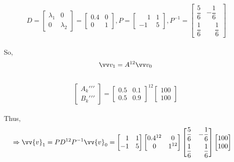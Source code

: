 \documentclass[10pt,a4paper]{article}
\numberwithin{equation}{section}
\begin{document}
	
		
		\[\ D=\begin{bmatrix}
				\lambda_{1} & 0 \\
				0 & \lambda_{2} 
				\end{bmatrix}
				=\begin{bmatrix}
				0.4 & 0 \\
				0 & 1
				\end{bmatrix}, 
				P = \begin{bmatrix}
					\phantom{-}1 & 1 \\
					-1 & 5
					\end{bmatrix},
				P^{-1} = \begin{bmatrix}
					\dfrac{5}{6} & -\dfrac{1}{6} \\[8pt]
					
					\dfrac{1}{6} & \phantom{-}\dfrac{1}{6}
					\end{bmatrix}
				\]
		\\
		So,
		\[\begin{aligned}
				\vv v_{1} = A^{12} \vv v_{0}
				\end{aligned}\]\\
		\[\begin{bmatrix}
		A_{k}{\prime\prime\prime}\\B_{k}{\prime\prime\prime}
		\end{bmatrix}
		=
		\begin{bmatrix}
		0.5 & 0.1\\ 0.5 & 0.9
		
		\end{bmatrix}^{12}
		\begin{bmatrix*}
		100 \\ 100
		\end{bmatrix*}\]\\
		Thus,
		\[\begin{aligned}\Rightarrow\vv{v}_1 = PD^{12}P^{-1} \vv{v}_0
				&=\begin{bmatrix}
						\phantom{-}1 & 1\\ -1 & 5
						\end{bmatrix}
						\begin{bmatrix}
						0.4^{12} & 0\\ 0 & 1^{12}
						\end{bmatrix}
						\begin{bmatrix}
						\dfrac{5}{6} & -\dfrac{1}{6} \\[8pt]
						\dfrac{1}{6} & \phantom{-}\dfrac{1}{6}
					\end{bmatrix}\begin{bmatrix}
					100 \\ 100
					\end{bmatrix}					
				\end{aligned}
				\]\\
				
\end{document}
